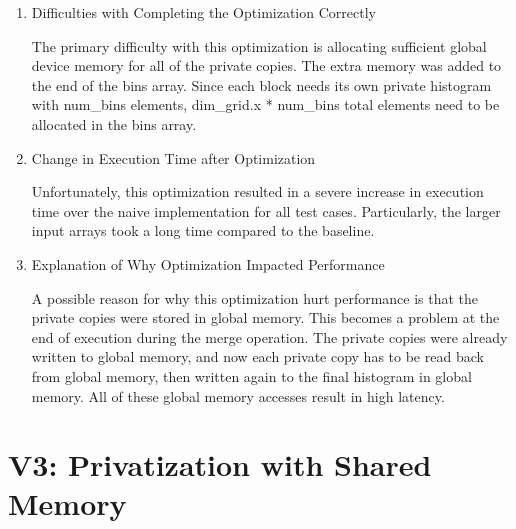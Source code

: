 \documentclass{article}
\begin{document}
\begin{enumerate}
	\item Difficulties with Completing the Optimization Correctly
	
	The primary difficulty with this optimization is allocating sufficient global device memory for all of the private copies. The extra memory was added to the end of the bins array. Since each block needs its own private histogram with num\_bins elements, dim\_grid.x * num\_bins total elements need to be allocated in the bins array.
	
	\item Change in Execution Time after Optimization
	
	Unfortunately, this optimization resulted in a severe increase in execution time over the naive implementation for all test cases. Particularly, the larger input arrays took a long time compared to the baseline. 
	
	\item Explanation of Why Optimization Impacted Performance
	
	A possible reason for why this optimization hurt performance is that the private copies were stored in global memory. This becomes a problem at the end of execution during the merge operation. The private copies were already written to global memory, and now each private copy has to be read back from global memory, then written again to the final histogram in global memory. All of these global memory accesses result in high latency.
	
\end{enumerate}

\section{V3: Privatization with Shared Memory}
\end{document}
